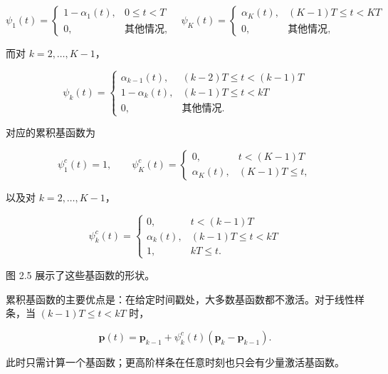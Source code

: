 \begin{equation}
\psi_1(t)=\begin{cases}1-\alpha_1(t),&0\le t<T\\0,&\text{其他情况},\end{cases}\quad
\psi_K(t)=\begin{cases}\alpha_K(t),&(K-1)T\le t<KT\\0,&\text{其他情况},\end{cases}\tag{2.56}
\end{equation}

而对 $k=2,\ldots,K-1$，

\begin{equation}
\psi_k(t)=\begin{cases}\alpha_{k-1}(t),&(k-2)T\le t<(k-1)T\\1-\alpha_k(t),&(k-1)T\le t<kT\\0,&\text{其他情况}.
\end{cases}\tag{2.57}
\end{equation}

对应的累积基函数为

\begin{equation}
\psi_1^c(t)=1,\qquad \psi_K^c(t)=\begin{cases}0,&t<(K-1)T\\\alpha_K(t),&(K-1)T\le t,\end{cases}\tag{2.58}
\end{equation}

以及对 $k=2,\ldots,K-1$，

\begin{equation}
\psi_k^c(t)=\begin{cases}0,&t<(k-1)T\\\alpha_k(t),&(k-1)T\le t<kT\\1,&kT\le t.
\end{cases}\tag{2.59}
\end{equation}

图 2.5 展示了这些基函数的形状。

累积基函数的主要优点是：在给定时间戳处，大多数基函数都不激活。对于线性样条，当 $(k-1)T\le t<kT$ 时，

\begin{equation}
\boldsymbol {p} (t) = \boldsymbol {p} _ {k - 1} + \psi_ {k} ^{c} (t) (\boldsymbol {p} _ {k} - \boldsymbol {p} _ {k - 1}).\tag{2.60}
\end{equation}

此时只需计算一个基函数；更高阶样条在任意时刻也只会有少量激活基函数。

